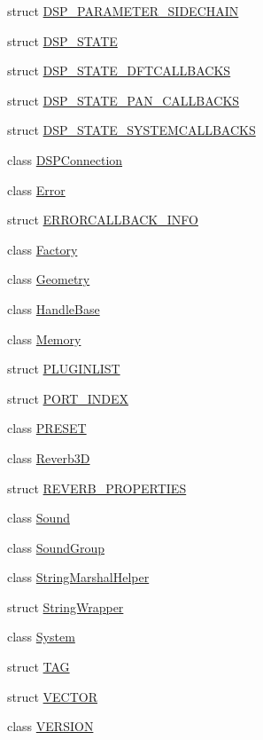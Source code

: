 \begin{DoxyCompactItemize}
\item 
struct \hyperlink{struct_f_m_o_d_1_1_d_s_p___p_a_r_a_m_e_t_e_r___s_i_d_e_c_h_a_i_n}{D\+S\+P\+\_\+\+P\+A\+R\+A\+M\+E\+T\+E\+R\+\_\+\+S\+I\+D\+E\+C\+H\+A\+IN}
\item 
struct \hyperlink{struct_f_m_o_d_1_1_d_s_p___s_t_a_t_e}{D\+S\+P\+\_\+\+S\+T\+A\+TE}
\item 
struct \hyperlink{struct_f_m_o_d_1_1_d_s_p___s_t_a_t_e___d_f_t_c_a_l_l_b_a_c_k_s}{D\+S\+P\+\_\+\+S\+T\+A\+T\+E\+\_\+\+D\+F\+T\+C\+A\+L\+L\+B\+A\+C\+KS}
\item 
struct \hyperlink{struct_f_m_o_d_1_1_d_s_p___s_t_a_t_e___p_a_n___c_a_l_l_b_a_c_k_s}{D\+S\+P\+\_\+\+S\+T\+A\+T\+E\+\_\+\+P\+A\+N\+\_\+\+C\+A\+L\+L\+B\+A\+C\+KS}
\item 
struct \hyperlink{struct_f_m_o_d_1_1_d_s_p___s_t_a_t_e___s_y_s_t_e_m_c_a_l_l_b_a_c_k_s}{D\+S\+P\+\_\+\+S\+T\+A\+T\+E\+\_\+\+S\+Y\+S\+T\+E\+M\+C\+A\+L\+L\+B\+A\+C\+KS}
\item 
class \hyperlink{class_f_m_o_d_1_1_d_s_p_connection}{D\+S\+P\+Connection}
\item 
class \hyperlink{class_f_m_o_d_1_1_error}{Error}
\item 
struct \hyperlink{struct_f_m_o_d_1_1_e_r_r_o_r_c_a_l_l_b_a_c_k___i_n_f_o}{E\+R\+R\+O\+R\+C\+A\+L\+L\+B\+A\+C\+K\+\_\+\+I\+N\+FO}
\item 
class \hyperlink{class_f_m_o_d_1_1_factory}{Factory}
\item 
class \hyperlink{class_f_m_o_d_1_1_geometry}{Geometry}
\item 
class \hyperlink{class_f_m_o_d_1_1_handle_base}{Handle\+Base}
\item 
class \hyperlink{class_f_m_o_d_1_1_memory}{Memory}
\item 
struct \hyperlink{struct_f_m_o_d_1_1_p_l_u_g_i_n_l_i_s_t}{P\+L\+U\+G\+I\+N\+L\+I\+ST}
\item 
struct \hyperlink{struct_f_m_o_d_1_1_p_o_r_t___i_n_d_e_x}{P\+O\+R\+T\+\_\+\+I\+N\+D\+EX}
\item 
class \hyperlink{class_f_m_o_d_1_1_p_r_e_s_e_t}{P\+R\+E\+S\+ET}
\item 
class \hyperlink{class_f_m_o_d_1_1_reverb3_d}{Reverb3D}
\item 
struct \hyperlink{struct_f_m_o_d_1_1_r_e_v_e_r_b___p_r_o_p_e_r_t_i_e_s}{R\+E\+V\+E\+R\+B\+\_\+\+P\+R\+O\+P\+E\+R\+T\+I\+ES}
\item 
class \hyperlink{class_f_m_o_d_1_1_sound}{Sound}
\item 
class \hyperlink{class_f_m_o_d_1_1_sound_group}{Sound\+Group}
\item 
class \hyperlink{class_f_m_o_d_1_1_string_marshal_helper}{String\+Marshal\+Helper}
\item 
struct \hyperlink{struct_f_m_o_d_1_1_string_wrapper}{String\+Wrapper}
\item 
class \hyperlink{class_f_m_o_d_1_1_system}{System}
\item 
struct \hyperlink{struct_f_m_o_d_1_1_t_a_g}{T\+AG}
\item 
struct \hyperlink{struct_f_m_o_d_1_1_v_e_c_t_o_r}{V\+E\+C\+T\+OR}
\item 
class \hyperlink{class_f_m_o_d_1_1_v_e_r_s_i_o_n}{V\+E\+R\+S\+I\+ON}
\end{DoxyCompactItemize}

